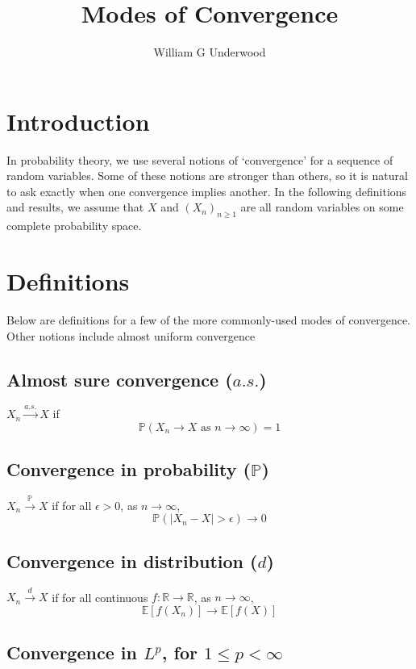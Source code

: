 \documentclass{article}
\title{Modes of Convergence}
\author{William G Underwood}
\begin{document}
\maketitle

\section{Introduction}

In probability theory, we use several notions of `convergence' for
a sequence of random variables.
Some of these notions are stronger than others, so it is natural to ask
exactly when one convergence implies another.
In the following definitions and results, we assume that $X$ and $(X_n)_{n \geq 1}$ are all
random variables on some complete probability space.


\section{Definitions}

Below are definitions for a few of the more
commonly-used modes of convergence.
Other notions include
almost uniform convergence

\subsection{Almost sure convergence ($a.s.$)}

$X_n \xrightarrow{a.s.} X$
if
$$\mathbb{P}(X_n \to X \text{ as } n \to \infty) = 1$$

\subsection{Convergence in probability ($\mathbb{P}$)}

$X_n \xrightarrow{\mathbb{P}} X$
if for all $\epsilon > 0$,
as $n \to \infty$,
$$\mathbb{P}(|X_n - X| > \epsilon) \to 0$$

\subsection{Convergence in distribution ($d$)}

$X_n \xrightarrow{d} X$
if for all continuous $f: \mathbb{R} \to \mathbb{R}$,
as $n \to \infty$,
$$\mathbb{E}[f(X_n)] \to \mathbb{E}[f(X)]$$

\subsection{Convergence in $L^p$, for $1 \leq p < \infty$}
\end{document}

